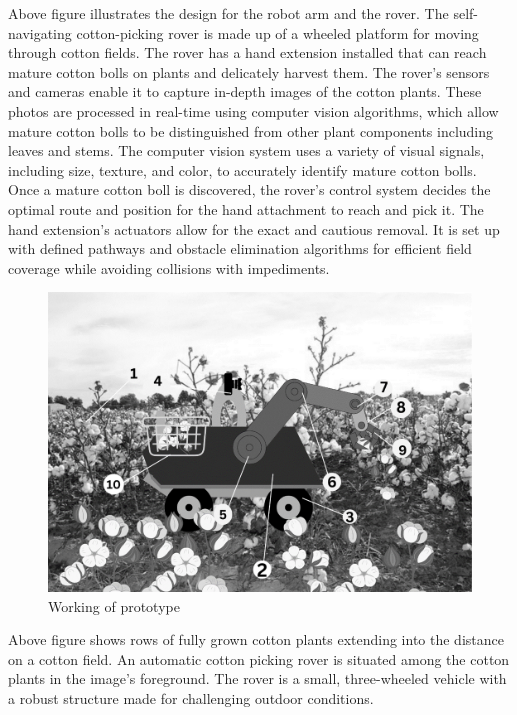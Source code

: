 \documentclass[12pt,a4paper]{report}
\begin{document}
\par Above figure illustrates the design for the robot arm and the rover. The self-navigating cotton-picking rover is made up of a wheeled platform for moving through cotton fields. The rover has a hand extension installed that can reach mature cotton bolls on plants and delicately harvest them. The rover's sensors and cameras enable it to capture in-depth images of the cotton plants. These photos are processed in real-time using computer vision algorithms, which allow mature cotton bolls to be distinguished from other plant components including leaves and stems. The computer vision system uses a variety of visual signals, including size, texture, and color, to accurately identify mature cotton bolls. 
Once a mature cotton boll is discovered, the rover's control system decides the optimal route and position for the hand attachment to reach and pick it. The hand extension's actuators allow for the exact and cautious removal. It is set up with defined pathways and obstacle elimination algorithms for efficient field coverage while avoiding collisions with impediments. 

\begin{figure}[H]
\begin{center}
\includegraphics[scale=0.7]{images/design/working.png}
\caption{Working of prototype}
\end{center}
\end{figure}

\par Above figure shows rows of fully grown cotton plants extending into the distance on a cotton field. 
An automatic cotton picking rover is situated among the cotton plants in the image's foreground. The rover is a small, three-wheeled vehicle with a robust structure made for challenging outdoor conditions. 
\end{document}
